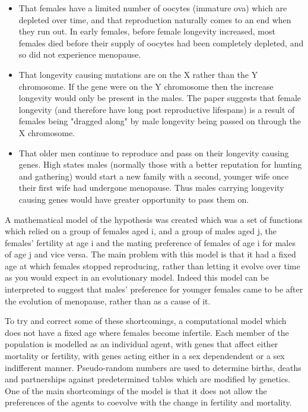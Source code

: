 \documentclass[authoryearcitations]{UoYCSproject}
\begin{document}
\begin{itemize}
\item That females have a limited number of oocytes (immature ova) which are depleted over time, and that reproduction naturally comes to an end when they run out. \cite{humanPopBio1994} In early females, before female longevity increased, most females died before their supply of oocytes had been completely depleted, and so did not experience menopause.
\item That longevity causing mutations are on the X rather than the Y chromosome. If the gene were on the Y chromosome then the increase longevity would only be present in the males. The paper suggests that female longevity (and therefore have long post reproductive lifespans) is a result of females being "dragged along" by male longevity being passed on through the X chromosome. 
\item That older men continue to reproduce and pass on their longevity causing genes. High states males (normally those with a better reputation for hunting and gathering) would start a new family with a second, younger wife once their first wife had undergone menopause. Thus males carrying longevity causing genes would have greater opportunity to pass them on.
\end{itemize}

A mathematical model of the hypothesis was created \cite{whyMenMatter2007} which was a set of functions which relied on a group of females aged i, and a group of males aged j, the females' fertility at age i and the mating preference of females of age i for males of age j and vice versa. The main problem with this model is that it had a fixed age at which females stopped reproducing, rather than letting it evolve over time as you would expect in an evolutionary model. Indeed this model can be interpreted to suggest that males' preference for younger females came to be after the evolution of menopause, rather than as a cause of it.

To try and correct some of these shortcomings, a computational model \cite{mateChoice2013} which does not have a fixed age where females become infertile. Each member of the population is modelled as an individual agent, with genes that affect either mortality or fertility, with genes acting either in a sex dependendent or a sex indifferent manner. Pseudo-random numbers are used to determine births, deaths and partnerships against predetermined tables which are modified by genetics. One of the main shortcomings of the model is that it does not allow the preferences of the agents to coevolve with the change in fertility and mortality. 
\end{document}
